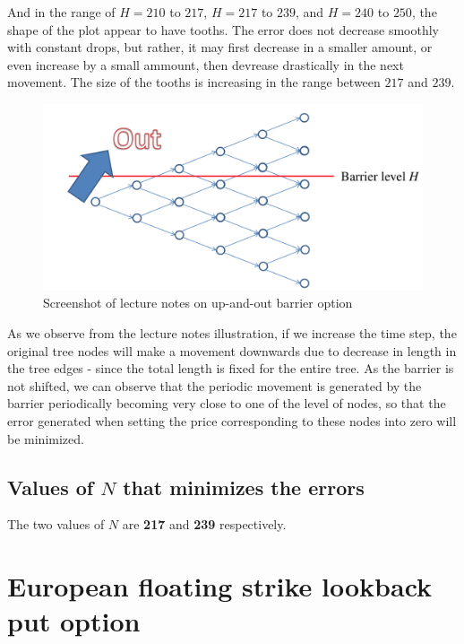 And in the range of $H = 210$ to $217$, $H = 217$ to $239$, and $H = 240$ to $250$, the shape of the plot appear to have tooths. The error does not decrease smoothly with constant drops, but rather, it may first decrease in a smaller amount, or even increase by a small ammount, then devrease drastically in the next movement. The size of the tooths is increasing in the range between $217$ and $239$.

\begin{figure}[htbp!]
	\centering
	\includegraphics[scale=0.4]{Lattice_lecturenotes.PNG}
	\caption{Screenshot of lecture notes on up-and-out barrier option}
\end{figure}

As we observe from the lecture notes illustration, if we increase the time step, the original tree nodes will make a movement downwards due to decrease in length in the tree edges - since the total length is fixed for the entire tree. As the barrier is not shifted, we can observe that the periodic movement is generated by the barrier periodically becoming very close to one of the level of nodes, so that the error generated when setting the price corresponding to these nodes into zero will be minimized.

\subsection{Values of $N$ that minimizes the errors}
The two values of $N$ are \textbf{217} and \textbf{239} respectively.

\newpage

\section{European floating strike lookback put option}
